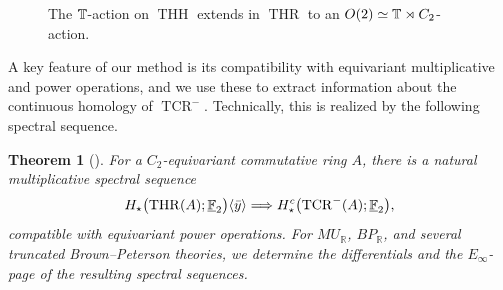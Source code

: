 \documentclass[11pt]{article}
\newtheorem{theorem}{Theorem}
\begin{document}
\begin{figure}[h]
\centering
{}
\captionsetup{font=footnotesize}
\caption{
The $\mathbb{T}$-action on $\operatorname{THH}$ extends in $\operatorname{THR}$ to an $O(2)\simeq \mathbb{T}\rtimes C_2$-action.
}
\end{figure}
A key feature of our method is its compatibility with equivariant multiplicative and power operations, and we use these to extract information about the continuous homology of $\operatorname{TCR}^-$.
Technically, this is realized by the following spectral sequence.
\begin{theorem}[\cite{CGKMQ}]
For a $C_2$-equivariant commutative ring $A$, there is a
natural multiplicative spectral sequence
\[
H_\star\bigl(\operatorname{THR}(A); \underline{\mathbb{F}}_2\bigr)\langle \bar y\rangle
\Longrightarrow
H^c_\star\bigl(\operatorname{TCR}^-(A); \underline{\mathbb{F}}_2\bigr),
\]
compatible with equivariant power operations.
For $MU_{\mathbb R}$, $BP_{\mathbb R}$, and several truncated
Brown--Peterson theories, we determine the differentials and the $E_\infty$-page of the resulting spectral sequences.
\end{theorem}
\end{document}
